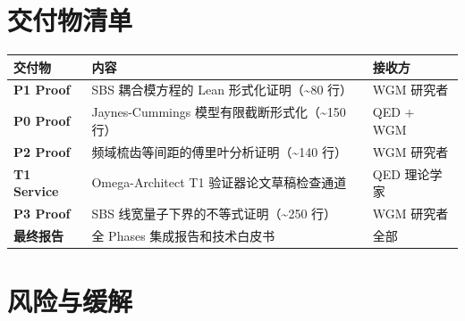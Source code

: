 \documentclass[
  11pt,
  a4paper,
]{ctexrep}
\newcounter{none} %
\begin{document}
\section{交付物清单}\label{ux4ea4ux4ed8ux7269ux6e05ux5355}

{\def\LTcaptype{none} %
\begin{longtable}[]{@{}
  >{\raggedright\arraybackslash}p{}
  >{\raggedright\arraybackslash}p{}
  >{\raggedright\arraybackslash}p{}@{}}
\toprule\noalign{}
\begin{minipage}[b]{\linewidth}\raggedright
交付物
\end{minipage} & \begin{minipage}[b]{\linewidth}\raggedright
内容
\end{minipage} & \begin{minipage}[b]{\linewidth}\raggedright
接收方
\end{minipage} \\
\midrule\noalign{}
\endhead
\bottomrule\noalign{}
\endlastfoot
\textbf{P1 Proof} & SBS 耦合模方程的 Lean 形式化证明（\textasciitilde80
行） & WGM 研究者 \\
\textbf{P0 Proof} & Jaynes-Cummings
模型有限截断形式化（\textasciitilde150 行） & QED + WGM \\
\textbf{P2 Proof} & 频域梳齿等间距的傅里叶分析证明（\textasciitilde140
行） & WGM 研究者 \\
\textbf{T1 Service} & Omega-Architect T1 验证器论文草稿检查通道 & QED
理论学家 \\
\textbf{P3 Proof} & SBS 线宽量子下界的不等式证明（\textasciitilde250
行） & WGM 研究者 \\
\textbf{最终报告} & 全 Phases 集成报告和技术白皮书 & 全部 \\
\end{longtable}
}

\section{风险与缓解}\label{ux98ceux9669ux4e0eux7f13ux89e3}
\end{document}

